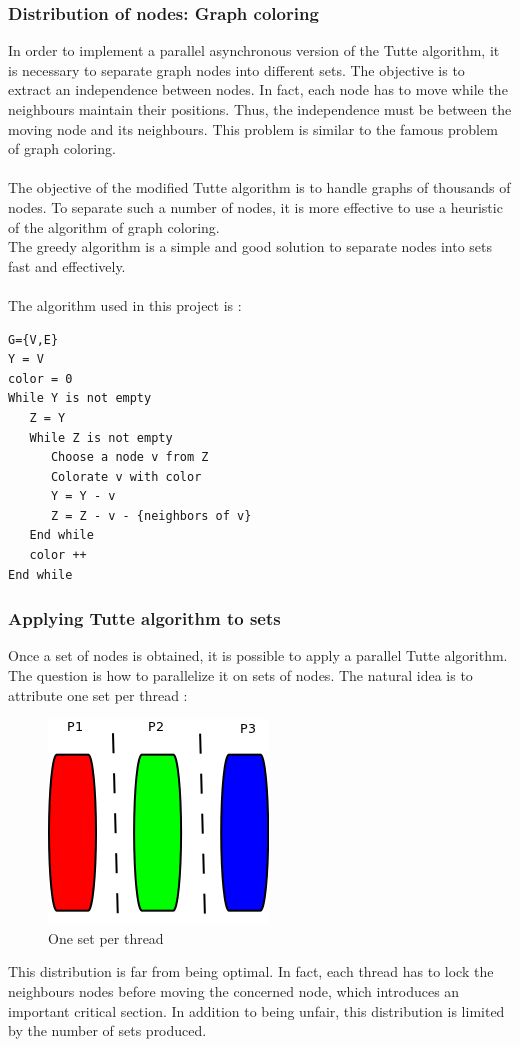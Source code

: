 \subsubsection{Distribution of nodes: Graph coloring}
In order to implement a parallel asynchronous version of the Tutte algorithm, it is necessary to separate graph nodes into different sets. The objective is to extract an independence between nodes. In fact, each node has to move while the neighbours maintain their positions. Thus, the independence must be between the moving node and its neighbours. This problem is similar to the famous problem of graph coloring.
\paragraph*{}
The objective of the modified Tutte algorithm is to handle graphs of thousands of nodes. To separate such a number of nodes, it is more effective to use a heuristic of the algorithm of graph coloring.\\
The greedy algorithm is a simple and good solution to separate nodes into sets fast and effectively.
\paragraph*{}
The algorithm used in this project is :
\begin{verbatim}
G={V,E}
Y = V
color = 0
While Y is not empty
   Z = Y
   While Z is not empty
      Choose a node v from Z
      Colorate v with color
      Y = Y - v
      Z = Z - v - {neighbors of v}
   End while
   color ++
End while
\end{verbatim}
\subsubsection{Applying Tutte algorithm to sets}
Once a set of nodes is obtained, it is possible to apply a parallel Tutte algorithm. The question is how to parallelize it on sets of nodes. The natural idea is to attribute one set per thread :
\begin{figure}[!h]
\centering
\includegraphics[scale=0.5]{img/distribution_verticale.png}
\caption{One set per thread}
\end{figure}
This distribution is far from being optimal. In fact, each thread has to lock the neighbours nodes before moving the concerned node, which introduces an important critical section. In addition to being unfair, this distribution is limited by the number of sets produced.\\

